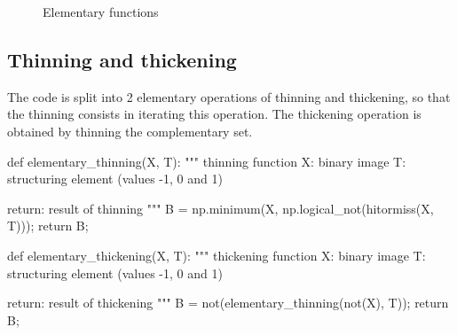 \begin{figure}[htbp]
 \centering\caption{Elementary functions}%
 \hfill
 \hfill
 \label{fig:morphological_skeleton:python:elementary}%
\end{figure}


\subsection{Thinning and thickening}
The code is split into 2 elementary operations of thinning and thickening, so that the thinning consists in iterating this operation. The thickening operation is obtained by thinning the complementary set.

\begin{python}
def elementary_thinning(X, T):
    """
    thinning function
    X: binary image
    T: structuring element (values -1, 0 and 1)
    
    return: result of thinning
    """
    B = np.minimum(X, np.logical_not(hitormiss(X, T)));
    return B;
\end{python}
\begin{python}
def elementary_thickening(X, T):
    """
    thickening function
    X: binary image
    T: structuring element (values -1, 0 and 1)
    
    return: result of thickening
    """
    B = not(elementary_thinning(not(X), T));
    return B;
\end{python}

